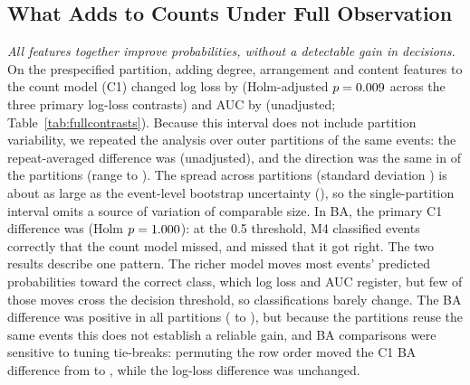 \documentclass[conference]{IEEEtran}
\begin{document}
\subsection{What Adds to Counts Under Full Observation}\label{sec:rq1}
\emph{All features together improve probabilities, without a detectable gain in decisions.} On the prespecified partition, adding degree, arrangement and content features to the count model (C1) changed log loss by \RCOneLLRaw{} \RCOneLLCI{} (Holm-adjusted $p=0.009$ across the three primary log-loss contrasts) and AUC by \RCOneAUC{} \RCOneAUCCI{} (unadjusted; Table~\ref{tab:fullcontrasts}). Because this interval does not include partition variability, we repeated the analysis over \RNPartitions{} outer partitions of the same events: the repeat-averaged difference was \RTwCOneLL{} \RTwCOneLLCI{} (unadjusted), and the direction was the same in \RTwCOneFav{} of the \RNPartitions{} partitions (range \RTwCOneMin{} to \RTwCOneMax). The spread across partitions (standard deviation \RTwPartSD) is about as large as the event-level bootstrap uncertainty (\RTwEventSD), so the single-partition interval omits a source of variation of comparable size. In BA, the primary C1 difference was \RCOneBA{} \RCOneBACI{} (Holm $p=1.000$): at the 0.5 threshold, M4 classified \RCOneOnlyAll{} events correctly that the count model missed, and missed \RCOneOnlyCounts{} that it got right. The two results describe one pattern. The richer model moves most events' predicted probabilities toward the correct class, which log loss and AUC register, but few of those moves cross the decision threshold, so classifications barely change. The BA difference was positive in all \RNPartitions{} partitions (\RTwCOneBAMin{} to \RTwCOneBAMax), but because the partitions reuse the same events this does not establish a reliable gain, and BA comparisons were sensitive to tuning tie-breaks: permuting the row order moved the C1 BA difference from \RRowOneStudy{} to \RRowOnePerm, while the log-loss difference was unchanged.
\end{document}

